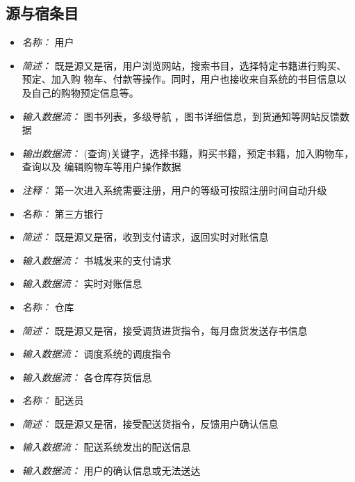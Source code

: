 \subsection{源与宿条目}
\begin{itemize}
\item \textit{名称： } 用户
\item \textit{简述： } 既是源又是宿，用户浏览网站，搜索书目，选择特定书籍进行购买、预定、加入购 物车、付款等操作。同时，用户也接收来自系统的书目信息以及自己的购物预定信息等。 
\item \textit{输入数据流： }图书列表，多级导航 ，图书详细信息，到货通知等网站反馈数据 
\item \textit{输出数据流： } (查询)关键字，选择书籍，购买书籍，预定书籍，加入购物车，查询以及 编辑购物车等用户操作数据
\item \textit{注释： } 第一次进入系统需要注册，用户的等级可按照注册时间自动升级

\end{itemize}


\vspace{-1mm}


\begin{itemize}
\item \textit{名称： } 第三方银行
\item \textit{简述： } 既是源又是宿，收到支付请求，返回实时对账信息
\item \textit{输入数据流： } 书城发来的支付请求 
\item \textit{输入数据流： } 实时对账信息

\end{itemize}


\vspace{-1mm}


\begin{itemize}
\item \textit{名称： } 仓库
\item \textit{简述： } 既是源又是宿，接受调货进货指令，每月盘货发送存书信息 
\item \textit{输入数据流： } 调度系统的调度指令
\item \textit{输入数据流： } 各仓库存货信息

\end{itemize}


\vspace{-1mm}


\begin{itemize}
\item \textit{名称： } 配送员
\item \textit{简述： } 既是源又是宿，接受配送货指令，反馈用户确认信息 
\item \textit{输入数据流： } 配送系统发出的配送信息
\item \textit{输入数据流： } 用户的确认信息或无法送达

\end{itemize}


